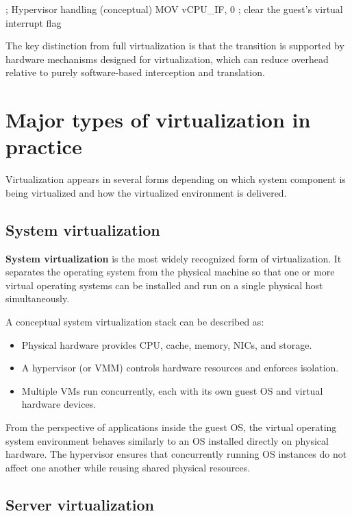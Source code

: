 \documentclass[11pt,a4paper,openany]{report}
\begin{document}
\begin{codeblock}
; Hypervisor handling (conceptual)
MOV vCPU_IF, 0   ; clear the guest's virtual interrupt flag
\end{codeblock}

The key distinction from full virtualization is that the transition is supported by hardware mechanisms designed for virtualization, which can reduce overhead relative to purely software-based interception and translation.

\section{Major types of virtualization in practice}

Virtualization appears in several forms depending on which system component is being virtualized and how the virtualized environment is delivered.

\subsection{System virtualization}

\textbf{System virtualization} is the most widely recognized form of virtualization. It separates the operating system from the physical machine so that one or more virtual operating systems can be installed and run on a single physical host simultaneously.

A conceptual system virtualization stack can be described as:

\begin{itemize}
\item Physical hardware provides CPU, cache, memory, NICs, and storage.
\item A hypervisor (or VMM) controls hardware resources and enforces isolation.
\item Multiple VMs run concurrently, each with its own guest OS and virtual hardware devices.
\end{itemize}

From the perspective of applications inside the guest OS, the virtual operating system environment behaves similarly to an OS installed directly on physical hardware. The hypervisor ensures that concurrently running OS instances do not affect one another while reusing shared physical resources.

\subsection{Server virtualization}
\end{document}
